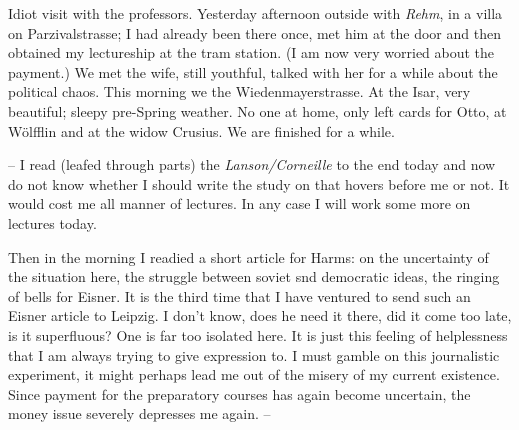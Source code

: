 
Idiot visit with the professors. Yesterday afternoon outside with \textit{Rehm}, in a villa on Parzivalstrasse; I had already been there once, met him at the door and then obtained my lectureship at the tram station. (I am now very worried about the payment.) We met the wife, still youthful, talked with her for a while about the political chaos. This morning we  the Wiedenmayerstrasse. At the Isar, very beautiful; sleepy pre-Spring weather. No one at home, only left cards for Otto, at Wölfflin and at the widow Crusius. We are finished for a while.

-- I read (leafed through parts) the \textit{Lanson/Corneille} to the end today and now do not know whether I should write the study on  that hovers before me or not. It would cost me all manner of lectures. In any case I will work some more on lectures today.

Then in the morning I readied a short article for Harms: on the uncertainty of the situation here, the struggle between soviet snd democratic ideas, the ringing of bells for Eisner. It is the third time that I have ventured to send such an Eisner article to Leipzig. I don't know, does he need it there, did it come too late, is it superfluous? One is far too isolated here. It is just this feeling of helplessness that I am always trying to give expression to. I must gamble on this journalistic experiment, it might perhaps lead me out of the misery of my current existence. Since payment for the preparatory courses has again become uncertain, the money issue severely depresses me again. --


